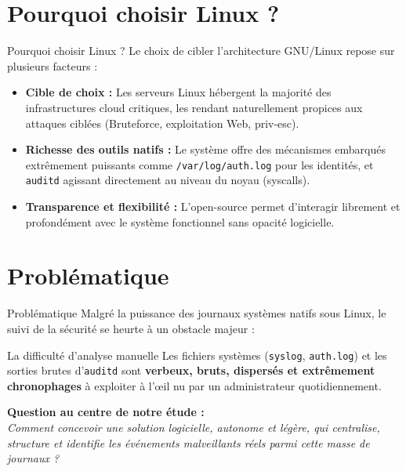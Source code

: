 \documentclass[10pt]{beamer}
\begin{document}
\section{Pourquoi choisir Linux ?}
\begin{frame}{Pourquoi choisir Linux ?}
    Le choix de cibler l'architecture GNU/Linux repose sur plusieurs facteurs :
    \vspace{0.3cm}
    \begin{itemize}
        \item \textbf{Cible de choix :} Les serveurs Linux hébergent la majorité des infrastructures cloud critiques, les rendant naturellement propices aux attaques ciblées (Bruteforce, exploitation Web, priv-esc).
        \item \textbf{Richesse des outils natifs :} Le système offre des mécanismes embarqués extrêmement puissants comme \texttt{/var/log/auth.log} pour les identités, et \texttt{auditd} agissant directement au niveau du noyau (syscalls).
        \item \textbf{Transparence et flexibilité :} L'open-source permet d'interagir librement et profondément avec le système fonctionnel sans opacité logicielle.
    \end{itemize}
\end{frame}

\section{Problématique}
\begin{frame}{Problématique}
    Malgré la puissance des journaux systèmes natifs sous Linux, le suivi de la sécurité se heurte à un obstacle majeur :
    \vspace{0.3cm}
    \begin{alertblock}{La difficulté d'analyse manuelle}
        Les fichiers systèmes (\texttt{syslog}, \texttt{auth.log}) et les sorties brutes d'\texttt{auditd} sont \textbf{verbeux, bruts, dispersés et extrêmement chronophages} à exploiter à l'œil nu par un administrateur quotidiennement.
    \end{alertblock}
    \vspace{0.3cm}
    \textbf{Question au centre de notre étude : }\\
    \textit{Comment concevoir une solution logicielle, autonome et légère, qui centralise, structure et identifie les événements malveillants réels parmi cette masse de journaux ?}
\end{frame}
\end{document}
